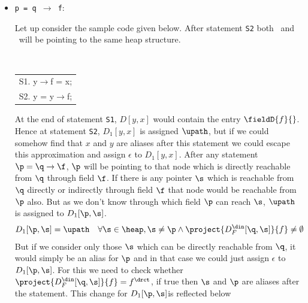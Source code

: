 \begin{itemize}
%
%

      
\item{\tt p = q $\rightarrow$ f}:
	
	Let up consider the sample code given below. After statement {\tt S2} both \p\ and \q\ will be pointing to the same heap structure.
{\small \tt
\begin{center}
    \begin{tabular}[b]{l}
      S1. y$\rightarrow$f = x; \\
      S2. y = y$\rightarrow$f; \\
    \end{tabular}
\end{center}
  }
  
	At the end of statement {\tt S1}, $D[y,x]$ would contain the entry $\fieldD{f}{}$. Hence at statement {\tt S2}, $D_1[y,x]$ is assigned
$\upath$, but if we could somehow find that $x$ and $y$ are aliases after this statement we could escape this
approximation and assign $\epsilon$ to  $D_1[y,x]$. After any statement $\p = \q \rightarrow \f$, $\p$ will be pointing to that node which is 
directly reachable from $\q$ through field $\f$. If there is any pointer $\s$ which is reachable from $\q$ directly or indirectly through field $\f$ 
that node would be reachable from $\p$ also. But as 
we don't know through which field $\p$ can reach $\s$, $\upath$ is assigned to $D_1[\p,\s]$.
\[
	D_1[\p, \s] =  \upath \quad  
	\forall \s \in \heap, \s \not=\p \wedge
	\project{D_F^{\din}[\q, \s]}{f} \not= \emptyset
	\]
But if we consider only those $\s$ which can be directly reachable from  $\q$, it would simply be an alias for $\p$ and in that case
we could just assign $\epsilon$ to $D_1[\p,\s]$. For this we need to check whether $\project{D_F^{\din}[\q, \s]}{f} = f^{\drct}$, if true then
$\s$ and $\p$ are aliases after the statement. This change for $D_1[\p, \s]$is reflected below


\end{itemize}
